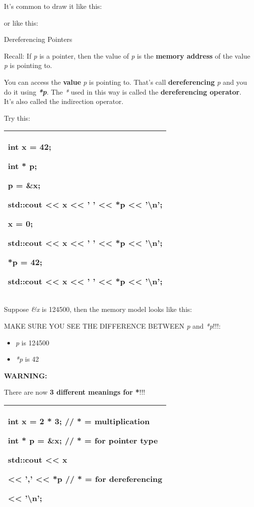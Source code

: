 \documentclass[
]{article}
\providecommand{\tightlist}{%
  \setlength{\itemsep}{0pt}\setlength{\parskip}{0pt}}
\begin{document}
It's common to draw it like this:

or like this:

Dereferencing Pointers

Recall: If \emph{p} is a pointer, then the value of \emph{p} is the
\textbf{memory address} of the value \emph{p} is pointing to.

You can access the \textbf{value} \emph{p} is pointing to. That's call
\textbf{dereferencing} \emph{p} and you do it using \emph{\textbf{*p}}.
The \emph{*} used in this way is called the \textbf{dereferencing
operator}. It's also called the indirection operator.

Try this:

\begin{longtable}[]{@{}l@{}}
\toprule
\endhead
\begin{minipage}[t]{0.97\columnwidth}\raggedright
int x = 42;

int * p;

p = \&x;

std::cout \textless\textless{} x \textless\textless{} ' '
\textless\textless{} *p \textless\textless{} '\textbackslash n';

x = 0;

std::cout \textless\textless{} x \textless\textless{} ' '
\textless\textless{} *p \textless\textless{} '\textbackslash n';

*p = 42;

std::cout \textless\textless{} x \textless\textless{} ' '
\textless\textless{} *p \textless\textless{} '\textbackslash n';\strut
\end{minipage}\tabularnewline
\bottomrule
\end{longtable}

Suppose \emph{\&x} is 124500, then the memory model looks like this:

MAKE SURE YOU SEE THE DIFFERENCE BETWEEN \emph{p} and \emph{*p}!!!:

\begin{itemize}
\tightlist
\item
  \emph{p} is 124500
\item
  \emph{*p} is 42
\end{itemize}

\textbf{WARNING:}

There are now \textbf{3 different meanings for *}!!!

\begin{longtable}[]{@{}l@{}}
\toprule
\endhead
\begin{minipage}[t]{0.97\columnwidth}\raggedright
int x = 2 * 3; // * = multiplication

int * p = \&x; // * = for pointer type

std::cout \textless\textless{} x

\textless\textless{} ',' \textless\textless{} *p // * = for
dereferencing

\textless\textless{} '\textbackslash n';\strut
\end{minipage}\tabularnewline
\bottomrule
\end{longtable}
\end{document}
